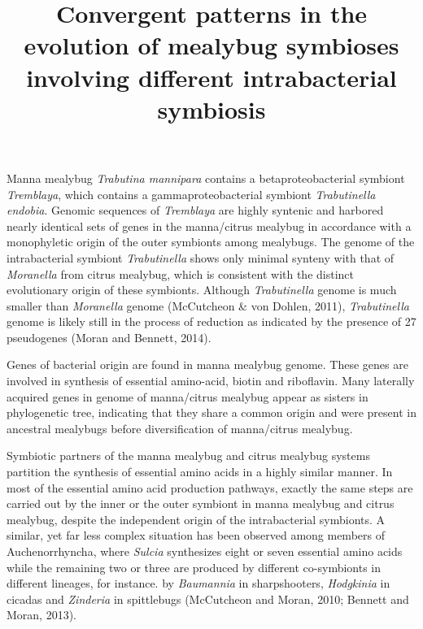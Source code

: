 \documentclass[11pt]{article}
\title{Convergent patterns in the evolution of mealybug symbioses involving different intrabacterial symbiosis}
\author{}
\date{}
\begin{document}
\begin{sloppypar}
  \maketitle

  \linenumbers
Manna mealybug \textit{Trabutina mannipara} contains a betaproteobacterial symbiont \textit{Tremblaya}, which contains a gammaproteobacterial symbiont \textit{Trabutinella endobia}. 
Genomic sequences of \textit{Tremblaya} are highly syntenic and harbored nearly identical sets of genes in the manna/citrus mealybug in accordance with a monophyletic origin of the outer symbionts among mealybugs. 
The genome of the intrabacterial symbiont \textit{Trabutinella} shows only minimal synteny with that of \textit{Moranella} from citrus mealybug, which is consistent with the distinct evolutionary origin of these symbionts. 
Although \textit{Trabutinella} genome is much smaller than \textit{Moranella} genome (McCutcheon & von Dohlen, 2011), \textit{Trabutinella} genome is likely still in the process of reduction as indicated by the presence of 27 pseudogenes (Moran and
Bennett, 2014). 

\newline

Genes of bacterial origin are found in manna mealybug genome. 
These genes are involved in synthesis of essential amino-acid, biotin and riboflavin. 
Many laterally acquired genes in genome of manna/citrus mealybug appear as sisters in phylogenetic tree, indicating that they share a common origin and were present in ancestral mealybugs before diversification of manna/citrus mealybug.

\newline

Symbiotic partners of the manna mealybug and citrus mealybug systems partition the synthesis of essential amino acids in a highly similar manner. 
In most of the essential amino acid production pathways, exactly the same steps are carried out by the inner or the outer symbiont in manna mealybug and citrus mealybug, despite the independent origin of the intrabacterial symbionts. 
A similar, yet far less complex situation has been observed among members of Auchenorrhyncha, where \textit{Sulcia} synthesizes eight or seven essential amino acids while the remaining two or three are produced by different co-symbionts in different lineages, for instance. by \textit{Baumannia} in sharpshooters, \textit{Hodgkinia} in cicadas and \textit{Zinderia} in spittlebugs (McCutcheon and Moran, 2010; Bennett and Moran, 2013).


\end{sloppypar}
\end{document}
